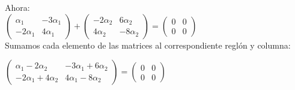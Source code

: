 \documentclass[letterpaper]{article}
\renewcommand{\*}{\cdot}
\theoremstyle{definition}
\begin{document}
Ahora:\\

$\begin{pmatrix} \alpha_1 & -3\alpha_{1} \\ -2\alpha_{1} & 4\alpha_{1} \end{pmatrix} +
\begin{pmatrix} -2\alpha_{2} & 6\alpha_2 \\ 4\alpha_{2} & -8\alpha_{2} \end{pmatrix} = \begin{pmatrix} 	0 & 0 \\ 0 & 0 \end{pmatrix}$\\

Sumamos cada elemento de las matrices al correspondiente reglón y columna:\\

\begin{center}
$\begin{pmatrix}
\alpha_{1}-2\alpha_{2} & -3\alpha_{1}+6\alpha_{2} \\ -2\alpha_{1}+4\alpha_{2} & 4\alpha_{1}-8\alpha_{2}
\end{pmatrix} = \begin{pmatrix}
0 & 0 \\ 0 & 0
\end{pmatrix}$
\end{center}
\end{document}
